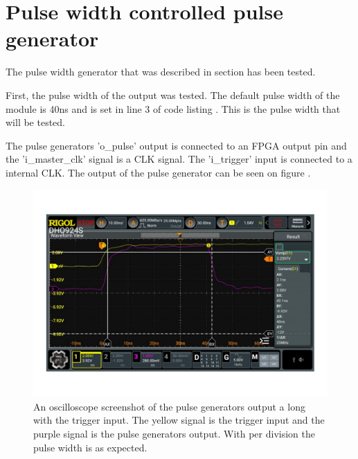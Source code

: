 \chapter{Pulse width controlled pulse generator} \label{App:PWCPulseGen}

The pulse width generator that was described in section  has been tested.

First, the pulse width of the output was tested. The default pulse width of the module is 40ns and is set in line 3 of code listing . This is the pulse width that will be tested.



The pulse generators 'o\_pulse' output is connected to an FPGA output pin and the 'i\_master\_clk' signal is a  CLK signal. The 'i\_trigger' input is connected to a  internal CLK. The output of the pulse generator can be seen on figure .

\begin{figure}[H]
    \centering
    \includegraphics[clip, trim=0 50 0 50, width=1\textwidth]{Appendix/Figures/A_PulseWidthGen_PulseWidth.pdf}
    \caption{An oscilloscope screenshot of the pulse generators output a long with the trigger input. The yellow signal is the trigger input and the purple signal is the pulse generators output. With  per division the pulse width is  as expected.}
    \label{fig:A_PulseGenWidth_WidthTest}
\end{figure}


